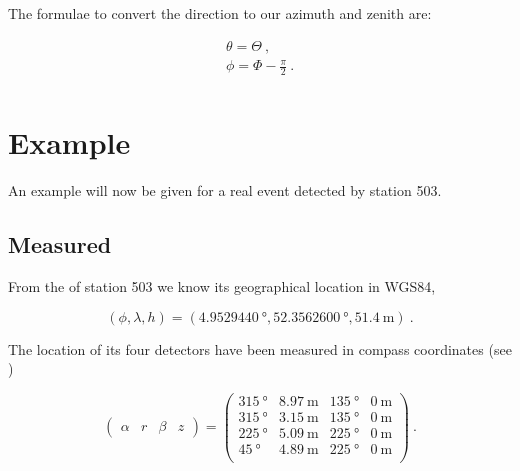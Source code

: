 The formulae to convert the \corsika direction to our azimuth and zenith
are:

\begin{equation}
    \begin{array}{l}
        \theta = \Theta \ , \\
        \phi = \Phi - \frac{\pi}{2} \ . \\
    \end{array}
\end{equation}


\section{Example}
\label{sec:example}

An example will now be given for a real \hisparc event detected by
station 503.


\subsection{Measured}

From the \gps of station 503 we know its geographical location in WGS84,

\begin{equation}
    (\phi, \lambda, h) = (\SI{4.9529440}{\degree},
                          \SI{52.3562600}{\degree},
                          \SI{51.4}{\meter}) \ .
\end{equation}

The location of its four detectors have been measured in compass
coordinates (see )

\begin{equation}
    \begin{pmatrix}
        \alpha & r & \beta & z
    \end{pmatrix}
        =
    \begin{pmatrix}
        \SI{315}{\degree} & \SI{8.97}{\meter} & \SI{135}{\degree} & \SI{0}{\meter} \\
        \SI{315}{\degree} & \SI{3.15}{\meter} & \SI{135}{\degree} & \SI{0}{\meter} \\
        \SI{225}{\degree} & \SI{5.09}{\meter} & \SI{225}{\degree} & \SI{0}{\meter} \\
        \SI{45}{\degree} & \SI{4.89}{\meter} & \SI{225}{\degree} & \SI{0}{\meter} \\
    \end{pmatrix} \ .
\end{equation}
                          
